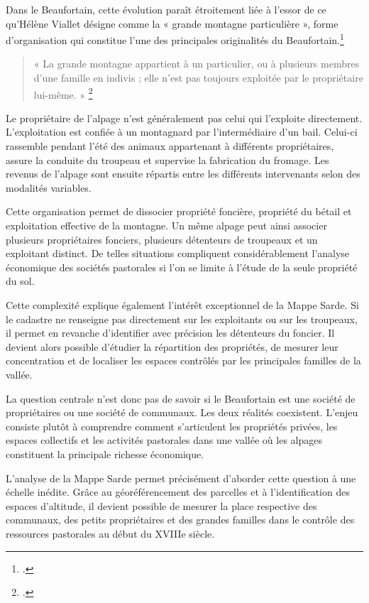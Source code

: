 \documentclass[12pt,a4paper]{report}
\begin{document}
Dans le Beaufortain, cette évolution paraît étroitement liée à l'essor de ce qu'Hélène Viallet désigne comme la « grande montagne particulière », forme d'organisation qui constitue l'une des principales originalités du Beaufortain.\footcite[48]{HViallet1993}

\begin{quote}
	« La grande montagne appartient à un particulier, ou à plusieurs membres d'une famille en indivis ; elle n'est pas toujours exploitée par le propriétaire lui-même. »
	\footcite[48]{HViallet1993}
\end{quote}

Le propriétaire de l'alpage n'est généralement pas celui qui l'exploite directement. L'exploitation est confiée à un montagnard par l'intermédiaire d'un bail. Celui-ci rassemble pendant l'été des animaux appartenant à différents propriétaires, assure la conduite du troupeau et supervise la fabrication du fromage. Les revenus de l'alpage sont ensuite répartis entre les différents intervenants selon des modalités variables.

Cette organisation permet de dissocier propriété foncière, propriété du bétail et exploitation effective de la montagne. Un même alpage peut ainsi associer plusieurs propriétaires fonciers, plusieurs détenteurs de troupeaux et un exploitant distinct. De telles situations compliquent considérablement l'analyse économique des sociétés pastorales si l'on se limite à l'étude de la seule propriété du sol.

Cette complexité explique également l'intérêt exceptionnel de la Mappe Sarde. Si le cadastre ne renseigne pas directement sur les exploitants ou sur les troupeaux, il permet en revanche d'identifier avec précision les détenteurs du foncier. Il devient alors possible d'étudier la répartition des propriétés, de mesurer leur concentration et de localiser les espaces contrôlés par les principales familles de la vallée.

La question centrale n'est donc pas de savoir si le Beaufortain est une société de propriétaires ou une société de communaux. Les deux réalités coexistent. L'enjeu consiste plutôt à comprendre comment s'articulent les propriétés privées, les espaces collectifs et les activités pastorales dans une vallée où les alpages constituent la principale richesse économique.

L'analyse de la Mappe Sarde permet précisément d'aborder cette question à une échelle inédite. Grâce au géoréférencement des parcelles et à l'identification des espaces d'altitude, il devient possible de mesurer la place respective des communaux, des petits propriétaires et des grandes familles dans le contrôle des ressources pastorales au début du XVIIIe siècle.
\end{document}
